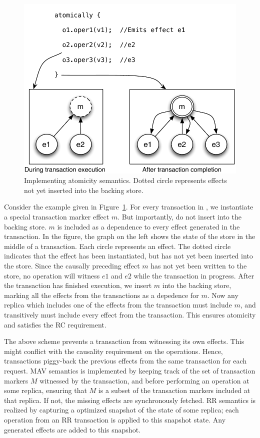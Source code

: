 \begin{figure}[t]
\begin{center}
\includegraphics[width=0.7\columnwidth]{Figures/AtomicityImpl}
\end{center}
\caption{Implementing atomicity semantics. Dotted circle represents effects not yet inserted into the backing store.}
\label{fig:atomicity_impl}
\end{figure}

Consider the example given in Figure~\ref{fig:atomicity_impl}. For every
transaction in \quelea, we instantiate a special transaction marker effect $m$.
But importantly, do not insert into the backing store. $m$ is included as a
dependence to every effect generated in the transaction. In the figure, the
graph on the left shows the state of the store in the middle of a transaction.
Each circle represents an effect. The dotted circle indicates that the effect
has been instantiated, but has not yet been inserted into the store. Since the
causally preceding effect $m$ has not yet been written to the store, no
operation will witness $e1$ and $e2$ while the transaction in progress. After
the transaction has finished execution, we insert $m$ into the backing store,
marking all the effects from the transactions as a depedence for $m$. Now any
replica which includes one of the effects from the transaction must include
$m$, and transitively must include every effect from the transaction. This
ensures atomicity and satisfies the RC requirement.

The above scheme prevents a transaction from witnessing its own effects. This
might conflict with the causality requirement on the operations. Hence,
transactions piggy-back the previous effects from the same transaction for each
request. MAV semantics is implemented by keeping track of the set of
transaction markers $M$ witnessed by the transaction, and before performing an
operation at some replica, ensuring that $M$ is a subset of the transaction
markers included at that replica. If not, the missing effects are synchronously
fetched. RR semantics is realized by capturing a optimized snapshot of the
state of some replica; each operation from an RR transaction is applied to this
snapshot state. Any generated effects are added to this snapshot.


